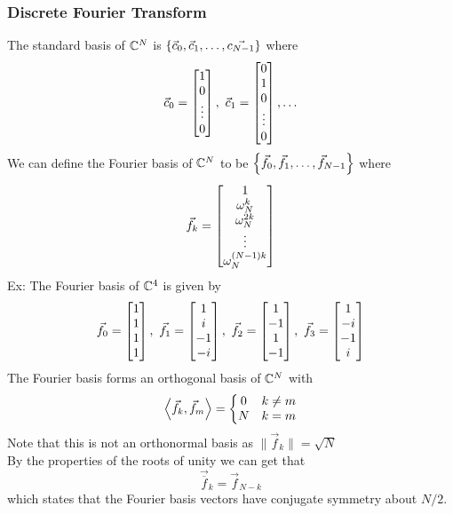 \documentclass[11pt, fleqn]{article}
\begin{document}
\subsubsection{Discrete Fourier Transform}
The standard basis of $\mathbb{C}^N$ is $\left\{ \vec{c}_0,\vec{c}_1,\ldots,\vec{c_{N-1}} \right\}$
where
$$\vec{c}_0=\matrixx{1\\0\\\vdots\\0},\ \vec{c}_1=\matrixx{0\\1\\0\\\vdots\\0},\ldots$$
We can define the Fourier basis of $\mathbb{C}^N$ to be $\left\{ \vec{f}_0,\vec{f}_1,\ldots,\vec{f}_{N-1} \right\}$
where
$$\vec{f}_k=\matrixx{1\\ \omega_N^k\\ \omega_N^{2k}\\ \vdots\\ \omega_N^{(N-1)k}}$$
Ex: The Fourier basis of $\mathbb{C}^4$ is given by
$$\vec{f}_0=\matrixx{1\\1\\1\\1},\ \vec{f}_1=\matrixx{1\\i\\-1\\-i},\ \vec{f}_2=\matrixx{1\\-1\\1\\-1},\ \vec{f}_3=\matrixx{1\\-i\\-1\\ i}$$
The Fourier basis forms an orthogonal basis of $\mathbb{C}^N$ with
$$\left\langle \vec{f}_k,\vec{f}_m \right\rangle=\left\{\begin{matrix} 0 & k\neq m\\ N & k=m \end{matrix}\right.$$
Note that this is not an orthonormal basis as $\|\vec{f}_k\|=\sqrt{N}$\\
By the properties of the roots of unity we can get that
$$\vec{\overline{f}}_k=\vec{f}_{N-k}$$
which states that the Fourier basis vectors have conjugate symmetry about $N/2$.\\
\end{document}
